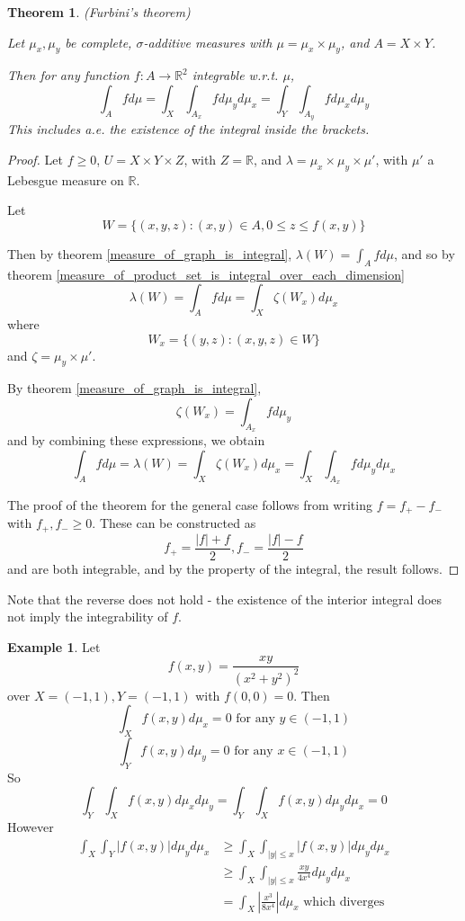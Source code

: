 \documentclass[11pt,a4paper]{report}
\theoremstyle{plain}
\newtheorem{thm}{Theorem}[section]
\theoremstyle{definition}
\newtheorem*{eg}{Example}
\theoremstyle{remark}
\newcommand{\R}{\mathbb{R}}
\newcommand{\abs}[1]{\left| #1 \right|}
\begin{document}
\begin{thm}(Furbini's theorem)

    Let $\mu_x, \mu_y$ be complete, $\sigma$-additive measures with $\mu = \mu_x \times \mu_y$, and $A = X \times Y$.

    Then for any function $f : A \rightarrow \R^2$ integrable w.r.t. $\mu$,
    $$ \int_A f d\mu = \int_X \int_{A_x} f d\mu_y d\mu_x = \int_Y \int_{A_y} f d\mu_x d\mu_y $$
  This includes a.e. the existence of the integral inside the brackets.
\end{thm}

\begin{proof}
    Let $f \ge 0$, $U = X \times Y \times Z$, with $Z = \R$, and $\lambda = \mu_x \times \mu_y \times \mu'$, with $\mu'$ a Lebesgue measure on $\R$.

    Let
    $$ W = \{ (x, y, z) : (x, y) \in A, 0 \le z \le f(x, y) \} $$

    Then by theorem \ref{measure_of_graph_is_integral}, $\lambda(W) = \int_A f d\mu$, and so by theorem \ref{measure_of_product_set_is_integral_over_each_dimension}
    $$ \lambda(W) = \int_A f d\mu = \int_X \zeta(W_x) d \mu_x $$
    where
    $$ W_x = \{ (y, z) : (x, y, z) \in W \} $$
    and $\zeta = \mu_y \times \mu'$.

    By theorem \ref{measure_of_graph_is_integral},
    $$ \zeta(W_x) = \int_{A_x} f d\mu_y $$
    and by combining these expressions, we obtain
    $$ \int_A f d\mu = \lambda(W) = \int_X \zeta(W_x) d\mu_x = \int_X \int_{A_x} f d\mu_y d\mu_x $$

    The proof of the theorem for the general case follows from writing $ f = f_{+} - f_{-}$ with $f_{+}, f_{-} \ge 0$. These can be constructed as
    $$ f_{+} = \frac{\abs{f} + f}{2}, f_{-} = \frac{\abs{f} - f}{2} $$
    and are both integrable, and by the property of the integral, the result follows.
\end{proof}

Note that the reverse does not hold - the existence of the interior integral does not imply the integrability of $f$.

\begin{eg}
  Let 
  $$f(x, y) = \frac{xy}{(x^2 + y^2)^2}$$
  over $X = (-1, 1), Y = (-1, 1)$ with $f(0, 0) = 0$. Then
  $$ \int_X f(x, y) d \mu_x = 0 \text{ for any } y \in (-1, 1) $$
  $$ \int_Y f(x, y) d \mu_y = 0 \text{ for any } x \in (-1, 1) $$
  So
  $$ \int_Y \int_X f(x, y) d\mu_x d\mu_y = \int_Y \int_X f(x, y) d\mu_y d\mu_x = 0 $$
  However
  \begin{align*}
      \int_X \int_Y \abs{f(x, y)} d\mu_y d\mu_x &\ge \int_X \int_{\abs{y} \le x} \abs{f(x, y)} d\mu_y d\mu_x \\
      &\ge \int_X \int_{\abs{y} \le x} \frac{xy}{4x^4} d\mu_y d\mu_x \\
      &= \int_X \abs{\frac{x^3}{8x^4}} d\mu_x \text{ which diverges}
  \end{align*}
\end{eg}
\end{document}
